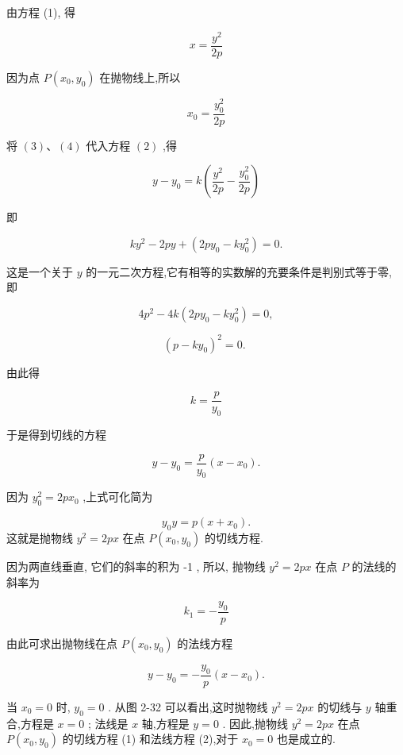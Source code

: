 \documentclass[lang=cn,newtx,12pt,scheme=chinese]{elegantbook}
\begin{document}
由方程 (1), 得

\[
  x = \frac{{y}^{2}}{2p} \tag{3}
\]

因为点 \(P\left( {{x}_{0},{y}_{0}}\right)\) 在抛物线上,所以

\[
    {x}_{0} = \frac{{y}_{0}^{2}}{2p} \tag{4}
\]

将 \(\left( 3\right) \text{、}\left( 4\right)\) 代入方程 \(\left( 2\right)\) ,得

\[
  y - {y}_{0} = k\left( {\frac{{y}^{2}}{2p} - \frac{{y}_{0}^{2}}{2p}}\right)
\]

即

\[
  k{y}^{2} - {2py} + \left( {{2p}{y}_{0} - k{y}_{0}^{2}}\right) = 0.
\]

这是一个关于 \(y\) 的一元二次方程,它有相等的实数解的充要条件是判别式等于零, 即

\[
  4{p}^{2} - {4k}\left( {{2p}{y}_{0} - k{y}_{0}^{2}}\right) = 0,
\]

\[
    {\left( p - k{y}_{0}\right) }^{2} = 0\text{. }
\]

由此得

\[
  k = \frac{p}{{y}_{0}}
\]

于是得到切线的方程

\[
  y - {y}_{0} = \frac{p}{{y}_{0}}\left( {x - {x}_{0}}\right) .
\]

因为 \({y}_{0}^{2} = {2p}{x}_{0}\) ,上式可化简为

\begin{corollary}[抛物线 \({y}^{2} = {2px}\) 的切线方程]
\[
    {y}_{0}y = p\left( {x + {x}_{0}}\right) . \tag{1}
\]
这就是抛物线 \({y}^{2} = {2px}\) 在点 \(P\left( {{x}_{0},{y}_{0}}\right)\) 的切线方程.
\end{corollary}
因为两直线垂直, 它们的斜率的积为 -1 , 所以, 抛物线 \({y}^{2} = {2px}\) 在点 \(P\) 的法线的斜率为

\[
    {k}_{1} = - \frac{{y}_{0}}{p}
\]

由此可求出抛物线在点 \(P\left( {{x}_{0},{y}_{0}}\right)\) 的法线方程
\begin{corollary}[抛物线 \({y}^{2} = {2px}\) 的法线方程]
\[
  y - {y}_{0} = - \frac{{y}_{0}}{p}\left( {x - {x}_{0}}\right) . \tag{2}
\]
\end{corollary}
当 \({x}_{0} = 0\) 时, \({y}_{0} = 0\) . 从图 2-32 可以看出,这时抛物线 \({y}^{2} = {2px}\) 的切线与 \(y\) 轴重合,方程是 \(x = 0\) ; 法线是 \(x\) 轴,方程是 \(y = 0\) . 因此,抛物线 \({y}^{2} = {2px}\) 在点 \(P\left( {{x}_{0},{y}_{0}}\right)\) 的切线方程 (1) 和法线方程 (2),对于 \({x}_{0} = 0\) 也是成立的.
\end{document}
